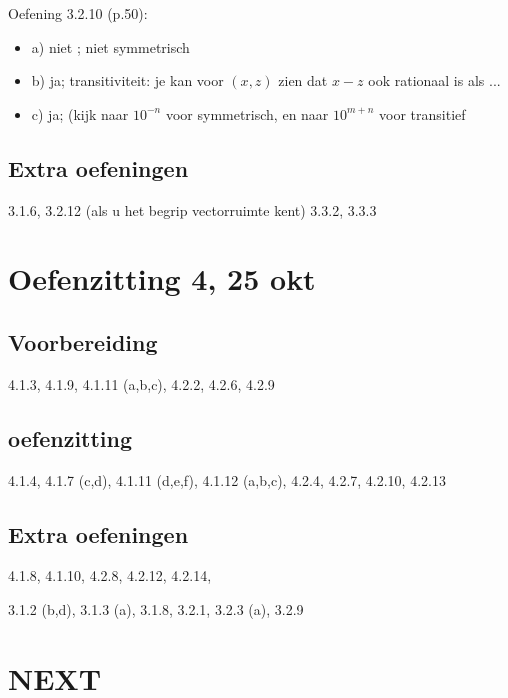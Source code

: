 \documentclass{article}
\begin{document}
Oefening 3.2.10 (p.50): 
\begin{itemize}
    \item a) niet ; niet symmetrisch
    \item b) ja; transitiviteit: je kan voor $(x,z)$ zien dat $x-z$ ook rationaal is als ...
    \item c) ja; (kijk naar $10^{-n}$ voor symmetrisch, en naar $10^{m+n}$ voor transitief
\end{itemize}

\subsection*{Extra oefeningen} 

3.1.6, 
3.2.12 (als u het begrip vectorruimte kent)
3.3.2, 
3.3.3 


\section*{Oefenzitting 4, 25 okt} 


\subsection*{Voorbereiding}

4.1.3, 4.1.9, 4.1.11 (a,b,c), 4.2.2, 4.2.6, 4.2.9 

\subsection*{oefenzitting} 

4.1.4, 4.1.7 (c,d), 4.1.11 (d,e,f), 4.1.12 (a,b,c), 4.2.4, 4.2.7, 4.2.10, 4.2.13 

\subsection{Extra oefeningen}

 4.1.8, 4.1.10, 4.2.8, 4.2.12, 4.2.14,

3.1.2 (b,d), 3.1.3 (a), 3.1.8, 3.2.1, 3.2.3 (a), 3.2.9

\section*{NEXT}
\end{document}

